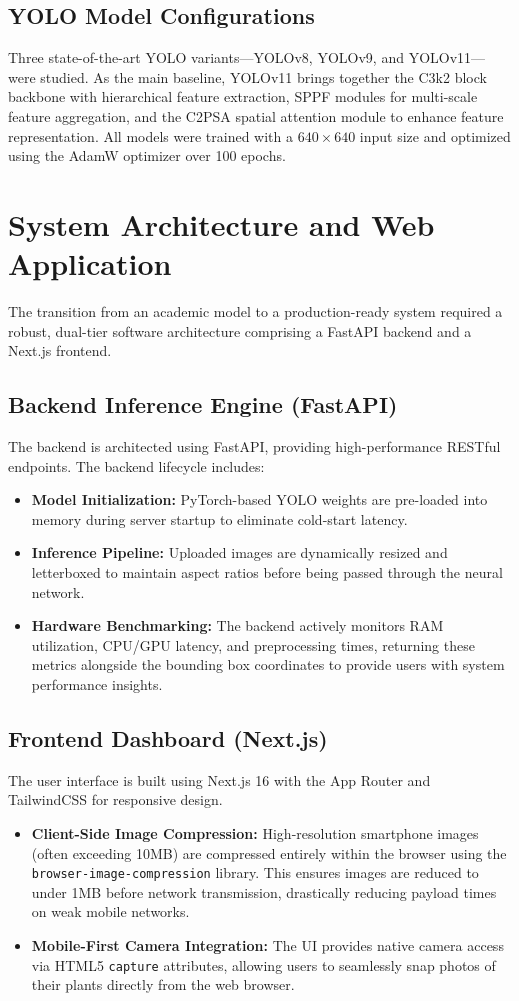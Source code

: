 \documentclass[12pt, a4paper]{article}
\begin{document}
\subsection{YOLO Model Configurations}
Three state-of-the-art YOLO variants—YOLOv8, YOLOv9, and YOLOv11—were studied. As the main baseline, YOLOv11 brings together the C3k2 block backbone with hierarchical feature extraction, SPPF modules for multi-scale feature aggregation, and the C2PSA spatial attention module to enhance feature representation. All models were trained with a $640\times640$ input size and optimized using the AdamW optimizer over 100 epochs.

\section{System Architecture and Web Application}
The transition from an academic model to a production-ready system required a robust, dual-tier software architecture comprising a FastAPI backend and a Next.js frontend.

\subsection{Backend Inference Engine (FastAPI)}
The backend is architected using FastAPI, providing high-performance RESTful endpoints. The backend lifecycle includes:
\begin{itemize}
    \item \textbf{Model Initialization:} PyTorch-based YOLO weights are pre-loaded into memory during server startup to eliminate cold-start latency.
    \item \textbf{Inference Pipeline:} Uploaded images are dynamically resized and letterboxed to maintain aspect ratios before being passed through the neural network. 
    \item \textbf{Hardware Benchmarking:} The backend actively monitors RAM utilization, CPU/GPU latency, and preprocessing times, returning these metrics alongside the bounding box coordinates to provide users with system performance insights.
\end{itemize}

\subsection{Frontend Dashboard (Next.js)}
The user interface is built using Next.js 16 with the App Router and TailwindCSS for responsive design.
\begin{itemize}
    \item \textbf{Client-Side Image Compression:} High-resolution smartphone images (often exceeding 10MB) are compressed entirely within the browser using the \texttt{browser-image-compression} library. This ensures images are reduced to under 1MB before network transmission, drastically reducing payload times on weak mobile networks.
    \item \textbf{Mobile-First Camera Integration:} The UI provides native camera access via HTML5 \texttt{capture} attributes, allowing users to seamlessly snap photos of their plants directly from the web browser.
\end{itemize}
\end{document}
